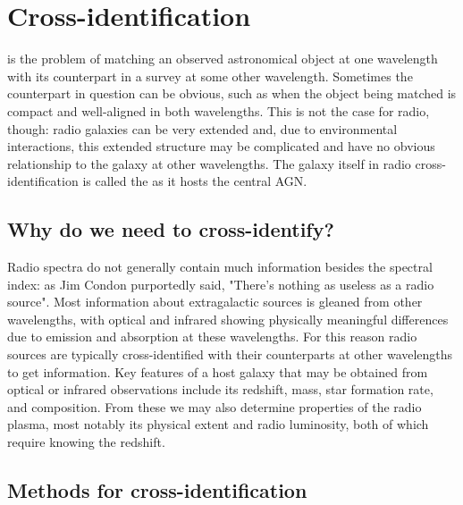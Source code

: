 \section{Cross-identification}
\label{sec:xid}
    
     is the problem of matching an observed astronomical object at one wavelength with its counterpart in a survey at some other wavelength. Sometimes the counterpart in question can be obvious, such as when the object being matched is compact and well-aligned in both wavelengths. This is not the case for radio, though: radio galaxies can be very extended and, due to environmental interactions, this extended structure may be complicated and have no obvious relationship to the galaxy at other wavelengths. The galaxy itself in radio cross-identification is called the  as it hosts the central AGN.

    \subsection{Why do we need to cross-identify?}
    \label{sec:xid-why}

        Radio spectra do not generally contain much information besides the spectral index: as Jim Condon purportedly said, "There's nothing as useless as a radio source". Most information about extragalactic sources is gleaned from other wavelengths, with optical and infrared showing physically meaningful differences due to emission and absorption at these wavelengths. For this reason radio sources are typically cross-identified with their counterparts at other wavelengths to get information. Key features of a host galaxy that may be obtained from optical or infrared observations include its redshift, mass, star formation rate, and composition. From these we may also determine properties of the radio plasma, most notably its physical extent and radio luminosity, both of which require knowing the redshift.

    \subsection{Methods for cross-identification}
    \label{sec:xid-how}

